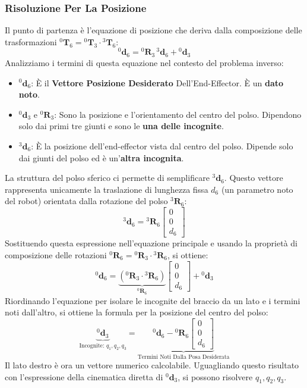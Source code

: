 ﻿\documentclass[11pt, a4paper]{article}
\begin{document}
\subsubsection*{Risoluzione Per La Posizione}
Il punto di partenza è l'equazione di posizione che deriva dalla composizione delle trasformazioni \({}^{0}\mathbf{T}_{6} = {}^{0}\mathbf{T}_{3} \cdot {}^{3}\mathbf{T}_{6}\):
\[
    {}^{0}\mathbf{d}_{6} = {}^0\mathbf{R}_3 \, {}^{3}\mathbf{d}_{6} + {}^{0}\mathbf{d}_{3}
\]
Analizziamo i termini di questa equazione nel contesto del problema inverso:
\begin{itemize}
    \item \({}^{0}\mathbf{d}_{6}\): È il \textbf{Vettore Posizione Desiderato} Dell'End-Effector. È un \textbf{dato noto}.
    \item \({}^{0}\mathbf{d}_{3}\) e \({}^0\mathbf{R}_3\): Sono la posizione e l'orientamento del centro del polso. Dipendono solo dai primi tre giunti e sono le \textbf{una delle incognite}.
    \item \({}^{3}\mathbf{d}_{6}\): È la posizione dell'end-effector vista dal centro del polso. Dipende solo dai giunti del polso ed è un'\textbf{altra incognita}.
\end{itemize}
La struttura del polso sferico ci permette di semplificare \({}^{3}\mathbf{d}_{6}\). Questo vettore rappresenta unicamente la traslazione di lunghezza fissa \(d_6\) (un parametro noto del robot) orientata dalla rotazione del polso \({}^3\mathbf{R}_6\):
\[
    {}^{3}\mathbf{d}_{6} = {}^3\mathbf{R}_6
    \begin{bmatrix} 0 \\ 0 \\ d_6 \end{bmatrix}
\]
Sostituendo questa espressione nell'equazione principale e usando la proprietà di composizione delle rotazioni \({}^0\mathbf{R}_6 = {}^0\mathbf{R}_3 \cdot {}^3\mathbf{R}_6\), si ottiene:
\[
    {}^{0}\mathbf{d}_{6} = \underbrace{({}^0\mathbf{R}_3 \cdot {}^3\mathbf{R}_6)}_{{}^0\mathbf{R}_6} \begin{bmatrix} 0 \\ 0 \\ d_6 \end{bmatrix} + {}^{0}\mathbf{d}_{3}
\]
Riordinando l'equazione per isolare le incognite del braccio da un lato e i termini noti dall'altro, si ottiene la formula per la posizione del centro del polso:
\[
    \underbrace{{}^{0}\mathbf{d}_{3}}_{\text{Incognite: } q_1, q_2, q_3} = \underbrace{{}^{0}\mathbf{d}_{6} - {}^0\mathbf{R}_6 \begin{bmatrix} 0 \\ 0 \\ d_6 \end{bmatrix}}_{\text{Termini Noti Dalla Posa Desiderata}}
\]
Il lato destro è ora un vettore numerico calcolabile. Uguagliando questo risultato con l'espressione della cinematica diretta di \({}^{0}\mathbf{d}_{3}\), si possono risolvere $q_1, q_2, q_3$.
\newpage
\end{document}
